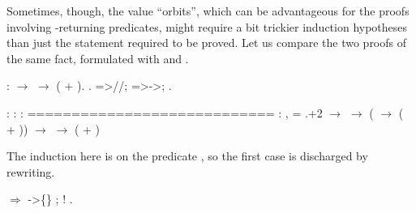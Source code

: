Sometimes, though, the value ``orbits'', which can be advantageous for
the proofs involving -returning predicates, might require a bit
trickier induction hypotheses than just the statement required to be
proved. Let us compare the two proofs of the same fact, formulated
with  and .


\begin{coqdoccode}
\coqdocemptyline
\coqdocnoindent
{}    :   \ensuremath{\rightarrow}   \ensuremath{\rightarrow}  ( + ).\coqdoceol
\coqdocnoindent
{}.\coqdoceol
\coqdocnoindent
{}=>//;   =>->;  .\coqdoceol
\coqdocemptyline
\end{coqdoccode}


\coqdoceol
\coqdocemptyline
\coqdocindent{1.00em}
 : \coqdoceol
\coqdocindent{1.00em}
 : \coqdoceol
\coqdocindent{1.00em}
 : \coqdoceol
\coqdocindent{1.00em}
============================\coqdoceol
\coqdocindent{1.50em}
\coqdockw{\ensuremath{\forall}}  : ,\coqdoceol
\coqdocindent{1.50em}
 = .+2 \ensuremath{\rightarrow}\coqdoceol
\coqdocindent{1.50em}
  \ensuremath{\rightarrow} (  \ensuremath{\rightarrow}  ( + )) \ensuremath{\rightarrow}   \ensuremath{\rightarrow}  ( + )

\coqdocemptyline


The induction here is on the predicate , so the first case is
discharged by rewriting.


\begin{coqdoccode}
\coqdocemptyline
\coqdocnoindent
{}\ensuremath{\Rightarrow} ->\{\}   ;   ! .\coqdoceol
\coqdocemptyline
\end{coqdoccode}


